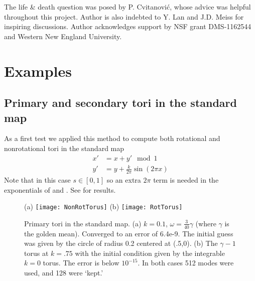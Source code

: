 \documentclass[aip,cha,reprint,
secnumarabic,
nofootinbib, tightenlines,
nobibnotes, showkeys, showpacs,
groupedaddress
]{revtex4-1}
\begin{document}
\begin{acknowledgments}
The life \& death question was posed by P. Cvitanovi{\'c}, whose advice
was helpful throughout this project.
Author is also indebted to
Y. Lan
and
J.D. Meiss
for inspiring discussions.
Author acknowledges support by NSF grant DMS-1162544
and Western New England University.
\end{acknowledgments}





\ifdraft
    \onecolumngrid

    \newpage
%
%
\fi

\iffalse
\section{Examples}
\subsection{Primary and secondary tori in the standard map}
As a first test we applied this method to compute both rotational and
nonrotational tori in the standard map
\begin{align}
x' & = x+ y' \mod 1\\
y' &= y+\frac{k}{2\pi} \sin(2\pi x)
\end{align}
Note that in this case $s \in [0,1]$ so an extra $2\pi$ term is needed in
the exponentials of    and .
See  for results.

\begin{figure}%
\centering
 (a) \texttt{[image: NonRotTorus]}
 (b) \texttt{[image: RotTorus]}
\caption{
Primary tori in the standard map.
(a)
$k=0.1$, $\omega=\frac{3}{40}\gamma$ (where
$\gamma$ is the golden mean). Converged to an error of 6.4e-9.
The initial guess was given by the circle of radius 0.2 centered at
(.5,0).
(b)
The $\gamma-1$ torus at $k=.75$ with
the initial condition given by the integrable $k=0$ torus.  The error is
below $10^{-15}$.  In both cases 512 modes were used, and 128 were
`kept.'
}
\label{fig:RotTorus}
\end{figure}
\end{document}
